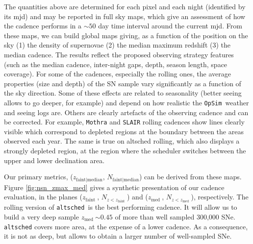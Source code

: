 \documentclass[a4paper,10pt]{article}
\newcommand{\zfaint}{$z_{\mathrm{faint}}\ $}
\newcommand{\nsnfaint}{$N_{z<z_{\mathrm{faint}}}\ $}
\newcommand{\zmed}{$z_{\mathrm{med}}\ $}
\newcommand{\nsnmed}{$N_{z<z_{\mathrm{med}}}\ $}
\newcommand{\opsim}{{\tt OpSim\ }}
\newcommand{\altsched}{{\tt altsched\ }}
\begin{document}
The quantities above are determined for each pixel and each night
(identified by its mjd) and may be reported in full sky maps, which give
an assessment of how the cadence performs in a $\sim 50$ day time
interval around the current mjd. From these maps, we can build global
maps giving, as a function of the position on the sky (1) the density
of supernovae (2) the median maximum redshift (3) the median cadence.
The results reflect the proposed observing strategy features (such as the median cadence, inter-night gaps, depth, season length, space coverage). For some of the cadences, especially the rolling ones, the average properties (size and
depth) of the SN sample vary significantly as a function of the sky
direction. Some of these effects are related to seasonality (better
seeing allows to go deeper, for example) and depend on how realistic
the \opsim weather and seeing logs are. Others are clearly artefacts
of the observing cadence and can be corrected. For example, {\tt Mothra} and {\tt SLAIR} rolling cadences show lines clearly
visible which correspond to depleted regions at the boundary between
the areas observed each year. The same is true on altsched rolling,
which also displays a strongly depleted region, at the region where
the scheduler switches between the upper and lower declination area.

Our primary metrics, ($z_{\mathrm{faint|median}}$, $N_{\mathrm{faint|median}}$) can be derived from these
maps.  Figure \ref{fig:nsn_zmax_med}
gives a synthetic presentation of our cadence evaluation, in the planes
(\zfaint, \nsnfaint) and (\zmed, \nsnmed), respectively. The rolling version of \altsched is the best performing cadence.  It will allow us to build a
very deep sample \zmed $\sim 0.45$ of more than well sampled 300,000
SNe.  {\tt altsched} covers more area, at the expense of a lower
cadence.  As a consequence, it is not as deep, but allows to obtain a
larger number of well-sampled SNe.
\end{document}
